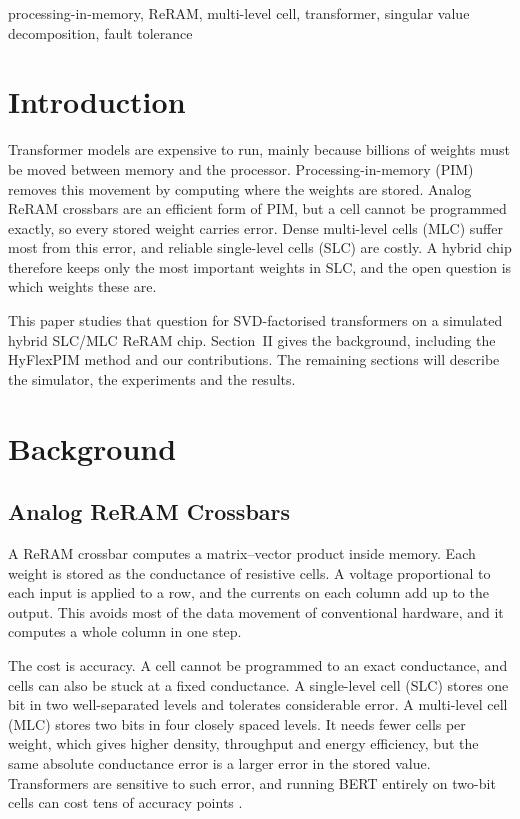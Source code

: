 \documentclass[conference]{IEEEtran}
\begin{document}
\begin{IEEEkeywords}
processing-in-memory, ReRAM, multi-level cell, transformer, singular value decomposition, fault tolerance
\end{IEEEkeywords}

\section{Introduction}
Transformer models \cite{devlin2019bert} are expensive to run, mainly because billions of weights must be
moved between memory and the processor. Processing-in-memory (PIM) removes this movement by computing where
the weights are stored. Analog ReRAM crossbars are an efficient form of PIM, but a cell cannot be
programmed exactly, so every stored weight carries error. Dense multi-level cells (MLC) suffer most from
this error, and reliable single-level cells (SLC) are costly. A hybrid chip therefore keeps only the most
important weights in SLC, and the open question is which weights these are.

This paper studies that question for SVD-factorised transformers on a simulated hybrid SLC/MLC ReRAM chip.
Section~II gives the background, including the HyFlexPIM method \cite{song2025hyflexpim} and our
contributions. The remaining sections will describe the simulator, the experiments and the results.

\section{Background}
\subsection{Analog ReRAM Crossbars}
A ReRAM crossbar computes a matrix--vector product inside memory. Each weight is stored as the
conductance of resistive cells. A voltage proportional to each input is applied to a row, and the currents
on each column add up to the output. This avoids most of the data movement of conventional hardware, and it
computes a whole column in one step.

The cost is accuracy. A cell cannot be programmed to an exact conductance, and cells can also be stuck at
a fixed conductance. A single-level cell (SLC) stores one bit in two well-separated levels and tolerates
considerable error. A multi-level cell (MLC) stores two bits in four closely spaced levels. It needs fewer
cells per weight, which gives higher density, throughput and energy efficiency, but the same absolute
conductance error is a larger error in the stored value. Transformers are sensitive to such error, and
running BERT entirely on two-bit cells can cost tens of accuracy points \cite{song2025hyflexpim}.
\end{document}
